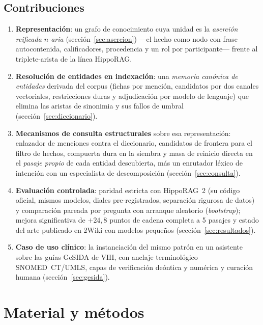 \documentclass[11pt,a4paper]{article}
\begin{document}
\subsection{Contribuciones}

\begin{enumerate}[leftmargin=1.6em, itemsep=2pt]
\item \textbf{Representación}: un grafo de conocimiento cuya unidad es la
  \emph{aserción reificada $n$-aria} (sección~\ref{sec:asercion}) ---el
  hecho como nodo con frase autocontenida, calificadores, procedencia y un
  rol por participante--- frente al triplete-arista de la línea HippoRAG.
\item \textbf{Resolución de entidades en indexación}: una \emph{memoria
  canónica de entidades} derivada del corpus (fichas por mención,
  candidatos por dos canales vectoriales, restricciones duras y
  adjudicación por modelo de lenguaje) que elimina las aristas de sinonimia
  y sus fallos de umbral (sección~\ref{sec:diccionario}).
\item \textbf{Mecanismos de consulta estructurales} sobre esa
  representación: enlazador de menciones contra el diccionario, candidatos
  de frontera para el filtro de hechos, compuerta dura en la siembra y masa
  de reinicio directa en el \emph{pasaje propio} de cada entidad
  descubierta, más un enrutador léxico de intención con un especialista de
  descomposición (sección~\ref{sec:consulta}).
\item \textbf{Evaluación controlada}: paridad estricta con HippoRAG~2 (su
  código oficial, mismos modelos, diales pre-registrados, separación
  rigurosa de datos) y comparación pareada por pregunta con arranque
  aleatorio (\emph{bootstrap}); mejora significativa de $+24{,}8$ puntos de
  cadena completa a 5 pasajes y estado del arte publicado en 2Wiki con
  modelos pequeños (sección~\ref{sec:resultados}).
\item \textbf{Caso de uso clínico}: la instanciación del mismo patrón en un
  asistente sobre las guías GeSIDA de VIH, con anclaje terminológico
  SNOMED~CT/UMLS, capas de verificación deóntica y numérica y curación
  humana (sección~\ref{sec:gesida}).
\end{enumerate}

\section{Material y métodos}
\label{sec:metodos}
\end{document}
